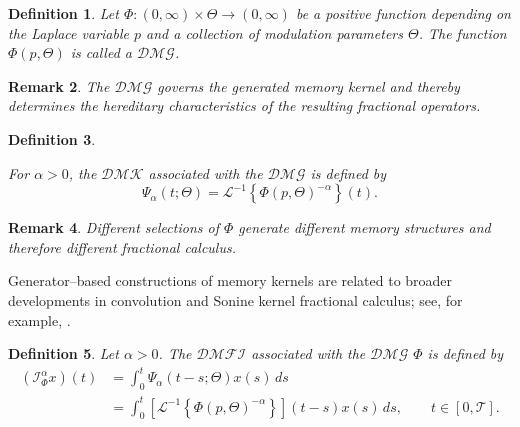 \documentclass[11pt]{article}
\numberwithin{equation}{section}
\newtheorem{definition}{Definition}[section]
\newtheorem{remark}[definition]{Remark}
\begin{document}
\begin{definition}

Let
\(
\Phi:(0,\infty)\times\Theta\to(0,\infty)
\)
be a positive function depending on the Laplace variable $p$ and a collection of modulation parameters $\Theta$.
The function
\(
\Phi(p,\Theta)
\)
is called a  $\mathcal{DMG}$.

\end{definition}


\begin{remark}

The $\mathcal{DMG}$ governs the generated memory kernel and thereby
determines the hereditary characteristics of the resulting fractional operators.

\end{remark}

\begin{definition}\label{23}

For \(\alpha>0\), the $\mathcal{DMK}$ associated with the $\mathcal{DMG}$  is defined by
\begin{equation}
\Psi_\alpha(t;\Theta)
=
\mathcal L^{-1}
\left\{
\Phi(p,\Theta)^{-\alpha}
\right\}(t).
\end{equation}

\end{definition}


\begin{remark}

Different selections of $\Phi$ generate different memory structures and therefore different fractional calculus.

\end{remark}

\noindent Generator--based constructions of memory kernels are related to broader developments in convolution and Sonine kernel fractional calculus; see, for example, \cite{Kochubei2011,Luchko2021,Samko1993}.


\begin{definition}\label{25}
Let $\alpha>0$. The $\mathcal{DMFI}$ associated with the $\mathcal{DMG}$ $\Phi$ is defined by
\begin{equation}
\begin{aligned}
(\mathcal I_\Phi^\alpha x)(t)
&=
\int_0^t
\Psi_\alpha(t-s;\Theta)x(s)\,ds  \\
&=
\int_0^t
\left[
\mathcal L^{-1}
\left\{
\Phi(p,\Theta)^{-\alpha}
\right\}
\right](t-s)
x(s)\,ds,
\qquad t\in[0,\mathcal{T}].
\end{aligned}
\end{equation}
\end{definition}
\end{document}
